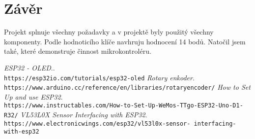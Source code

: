 \graphicspath{{Images/}}
\hypersetup{linkcolor=blue, urlcolor=blue}

\section{Závěr}

\begin{spacing}{1.5}
    \fontsize{14}{14}\selectfont
    Projekt splnuje všechny požadavky a v projektě byly použitý všechny komponenty. Podle hodnoticího klíče navhruju hodnocení 14 bodů. Natočil jsem také, které demonstruje činnost mikrokontroléru.

\end{spacing}

\vspace{80pt}

\begin{spacing}{1.5}
    \fontsize{12}{12}\selectfont
\begin{thebibliography}{Info}
    \emph{ESP32 - OLED}..\\
    \verb|https://esp32io.com/tutorials/esp32-oled|
    \emph{Rotary enkoder}.\\
\verb|https://www.arduino.cc/reference/en/libraries/rotaryencoder/|
    \emph{How to Set Up and use ESP32}.\\
\verb|https://www.instructables.com/How-to-Set-Up-WeMos-TTgo-ESP32-Uno-D1-R32/|
    \emph{VL53L0X Sensor Interfacing with ESP32}.\\
\verb|https://www.electronicwings.com/esp32/vl53l0x-sensor- interfacing-with-esp32|
\end{thebibliography}



\end{spacing}